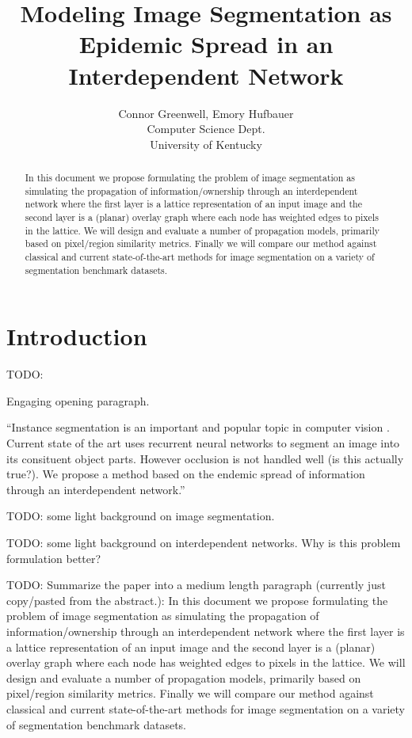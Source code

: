 \documentclass[twocolumn]{article}
\title{Modeling Image Segmentation as Epidemic Spread in an Interdependent Network}
\author{
  Connor Greenwell, Emory Hufbauer\\
  Computer Science Dept. \\
  University of Kentucky
}
\date{}
\newcommand{\todo}[1]{}
\renewcommand{\todo}[1]{{\color{red} TODO: {#1}}}
\begin{document}
\maketitle

\begin{abstract}
In this document we propose formulating the problem of image segmentation as simulating the propagation of
information/ownership through an interdependent network where the first layer is a lattice representation of an input image
and the second layer is a (planar) overlay graph where each node has weighted edges to pixels in the lattice. We will design
and evaluate a number of propagation models, primarily based on pixel/region similarity metrics. Finally we will compare our
method against classical and current state-of-the-art methods for image segmentation on a variety of segmentation benchmark
datasets. 
\end{abstract}

\section{Introduction}

\todo{
Engaging opening paragraph. 

``Instance segmentation is an important and popular topic in computer vision \cite{newell2017associative, li2017fully,
ren2017end}. Current state of the art uses recurrent neural networks to segment an image into its consituent object parts.
However occlusion is not handled well (is this actually true?). We propose a method based on the endemic spread of information
through an interdependent network.'' 
}

\todo{some light background on image segmentation.}

\todo{some light background on interdependent networks. Why is this problem formulation better?}

\todo{
Summarize the paper into a medium length paragraph (currently just copy/pasted from the abstract.): In this document we propose formulating the problem of image segmentation as simulating the propagation of
information/ownership through an interdependent network where the first layer is a lattice representation of an input image
and the second layer is a (planar) overlay graph where each node has weighted edges to pixels in the lattice. We will design
and evaluate a number of propagation models, primarily based on pixel/region similarity metrics. Finally we will compare our
method against classical and current state-of-the-art methods for image segmentation on a variety of segmentation benchmark
datasets. 
}
\end{document}
